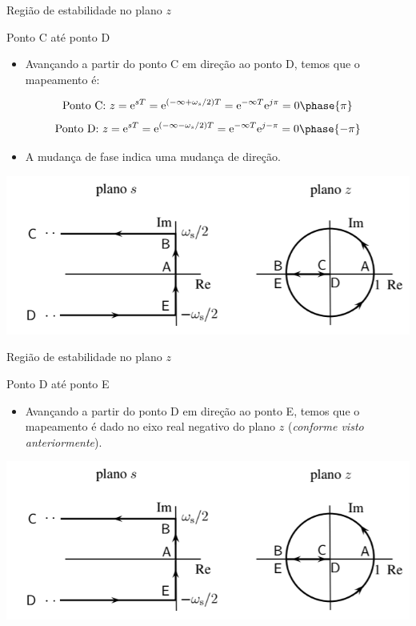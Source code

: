 \begin{frame}{Região de estabilidade no plano $z$}
\begin{block}{Ponto C até ponto D}
\begin{itemize}
	\item Avançando a partir do ponto C em direção ao ponto D, temos que o mapeamento é:
\end{itemize}
$$\text{Ponto C:} \ z = \text{e}^{sT} = \text{e}^{(-\infty+\omega_s/2)T} = \text{e}^{-\infty T} \text{e}^{j\pi} = 0\phase{\pi}$$
$$\text{Ponto D:} \ z = \text{e}^{sT} = \text{e}^{(-\infty-\omega_s/2)T} = \text{e}^{-\infty T} \text{e}^{j-\pi} = 0\phase{-\pi}$$
\vspace{-0.3cm}
\begin{itemize}
    \item A mudança de fase indica uma mudança de direção.
\end{itemize}
\end{block}
\centerline{\includegraphics[width=0.8\linewidth]{Figuras/Ch05/fig3.PNG}}
\end{frame}

\begin{frame}{Região de estabilidade no plano $z$}
\begin{block}{Ponto D até ponto E}
\begin{itemize}
	\item Avançando a partir do ponto D em direção ao ponto E, temos que o mapeamento é dado no eixo real negativo do plano $z$ (\textit{conforme visto anteriormente}).
\end{itemize}
\end{block}
\centerline{\includegraphics[width=0.9\linewidth]{Figuras/Ch05/fig3.PNG}}
\end{frame}

